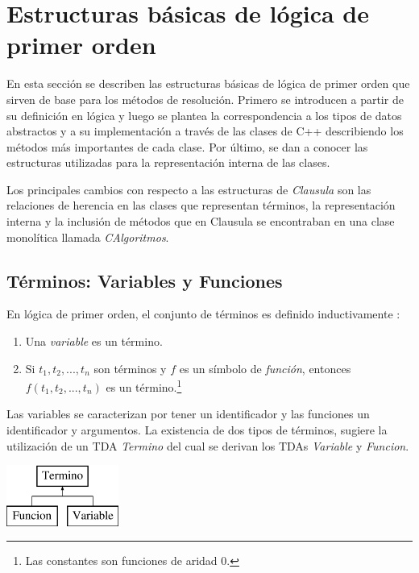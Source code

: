\documentclass[a4paper,12pt]{article}
\begin{document}
\section{Estructuras básicas de lógica de primer orden}
En esta sección se describen las estructuras básicas de lógica de primer orden que sirven de base para los métodos de resolución.
Primero se introducen a partir de su definición en lógica y luego se plantea la correspondencia a los tipos de datos abstractos
y a su implementación a través de las clases de C++ describiendo los métodos más importantes de cada clase. 
Por último, se dan a conocer las estructuras utilizadas para la representación interna de las clases.

Los principales cambios con respecto a las estructuras de \emph{Clausula} son las relaciones de herencia
en las clases que representan términos, la representación interna y la inclusión de métodos que en Clausula
se encontraban en una clase monolítica llamada \emph{CAlgoritmos}.
\subsection{Términos: Variables y Funciones} %
En lógica de primer orden, el conjunto de términos es definido inductivamente \cite{ApuntesLogica}:
\begin{enumerate}
\item Una \emph{variable} es un término.
\item Si $t_1,t_2,...,t_n$ son términos y $f$ es un símbolo de \emph{función}, entonces $f(t_1,t_2,...,t_n)$
  es un término.\footnote{Las constantes son funciones de aridad 0.}
\end{enumerate}
Las variables se caracterizan por tener un identificador y las funciones un identificador y argumentos. La existencia de
dos tipos de términos, sugiere la utilización de un  TDA \emph{Termino} del cual se derivan los TDAs \emph{Variable} y 
\emph{Funcion}.
\begin{center}
\leavevmode
\includegraphics[height=2cm]{imagenes/classTermino.eps}
\end{center}
\end{document}
